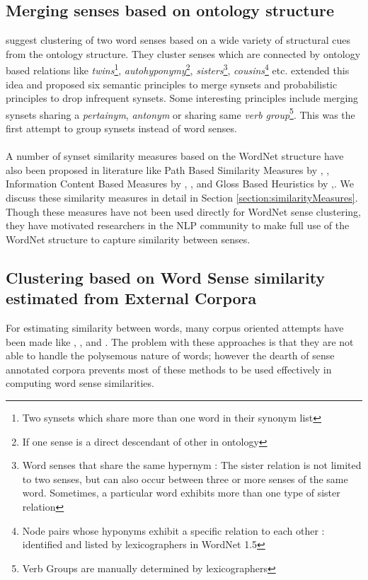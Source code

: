 \subsection{Merging senses based on ontology structure}
\citep{peters1998automatic} suggest clustering of two word senses based on a wide variety of structural cues from the ontology structure. They cluster senses which are connected by ontology based relations like  \textit{twins}\footnote{Two synsets which share more than one word in their synonym list}, \textit{autohyponymy}\footnote{If one sense is a direct descendant of other in ontology}, 
\textit{sisters}\footnote{Word senses that share the same hypernym : The sister relation is not limited to two senses, but can also occur between three or more senses of the same word. Sometimes, a particular word exhibits more than one type of sister relation}, 
\textit{cousins}\footnote{Node pairs whose hyponyms exhibit a specific relation to each other : identified and listed by lexicographers in WordNet 1.5} etc.
\citep{Mihalcea01ez.wordnet:principles} extended this idea and proposed six semantic principles to merge synsets and probabilistic principles to drop infrequent synsets.
Some interesting principles include merging synsets sharing a \textit{pertainym}, \textit{antonym} or sharing same \textit{verb group}\footnote{Verb Groups are manually determined by lexicographers}.
This was the first attempt to group synsets instead of word senses.

\paragraph{}
A number of synset similarity measures based on the WordNet structure have also been proposed in literature like 
Path Based Similarity Measures by \citep{WuPalmer:1994}, \citep{LCH:1998}, Information Content Based Measures by \citep{Resnik:1995}, \citep{JCN:1997}, \citep{Lin:1998} and Gloss Based Heuristics by \citep{Lesk:1986},\citep{Banerjee:2002}. We discuss these similarity measures in detail in Section \ref{section:similarityMeasures}.
Though these measures have not been used directly for WordNet sense clustering, they have motivated researchers in the NLP community to make full use of the WordNet structure to capture similarity between senses.

\subsection{Clustering based on Word Sense similarity estimated from External Corpora}
For estimating similarity between words, many corpus oriented attempts have been made like \citep{Pereira:93a}, \citep{Lin:1998}, \citep{kolb2008disco} and \citep{agirre2009study}. The problem with these approaches is that they are not able to handle the polysemous nature of words; however the dearth of sense annotated corpora prevents most of these methods to be used effectively in computing word sense similarities.

